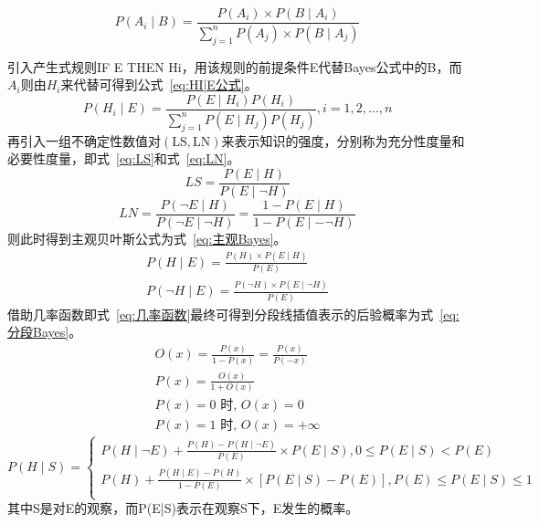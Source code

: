 \documentclass[12pt,a4paper,UTF8]{ctexart}
\begin{document}
\begin{equation}
    \label{eq:全概率Bayes}
    P\left(A_i \mid B\right)=\frac{P\left(A_i\right) \times P\left(B \mid A_i\right)}{\sum_{j=1}^n P\left(A_j\right) \times P\left(B \mid A_j\right)}
    \end{equation}

引入产生式规则IF E THEN Hi，用该规则的前提条件E代替Bayes公式中的B，而$ A_i $则由$ H_i $来代替可得到公式~\ref{eq:HI|E公式}。
\begin{equation}
    \label{eq:HI|E公式}
    P\left(H_i \mid E\right)=\frac{P\left(E \mid H_i\right) P\left(H_i\right)}{\sum_{j=1}^n P\left(E \mid H_j\right) P\left(H_j\right)}, i=1,2, \ldots, n
\end{equation}
再引入一组不确定性数值对$ (\mathrm{LS}, \mathrm{LN}) $来表示知识的强度，分别称为充分性度量和必要性度量，即式~\ref{eq:LS}和式~\ref{eq:LN}。
\begin{equation}
    \label{eq:LS}
    L S=\frac{P(E \mid H)}{P(E \mid \neg H)}
\end{equation}
\begin{equation}
    \label{eq:LN}
    L N=\frac{P(\neg E \mid H)}{P(\neg E \mid \neg H)}=\frac{1-P(E \mid H)}{1-P(E \mid-\neg H)}
\end{equation}
则此时得到主观贝叶斯公式为式~\ref{eq:主观Bayes}。
\begin{equation}
    \label{eq:主观Bayes}
    \begin{gathered}
    P(H \mid E)=\frac{P(H) \times P(E \mid H)}{P(E)} \\
    P(\neg H \mid E)=\frac{P(\neg H) \times P(E \mid \neg H)}{P(E)}
    \end{gathered}
\end{equation}
借助几率函数即式~\ref{eq:几率函数}最终可得到分段线插值表示的后验概率为式~\ref{eq:分段Bayes}。
\begin{equation}
    \label{eq:几率函数}
    \begin{gathered}
    O(x)=\frac{P(x)}{1-P(x)}=\frac{P(x)}{P(-x)} \\
    P(x)=\frac{O(x)}{1+O(x)} \\
    P(x)=0 \text { 时, } O(x)=0 \\
    P(x)=1 \text { 时, } O(x)=+\infty
    \end{gathered}
\end{equation}
\begin{equation}
    \label{eq:分段Bayes}
    P(H \mid S)=\left\{\begin{array}{c}
    P(H \mid \neg E)+\frac{P(H)-P(H \mid \neg E)}{P(E)} \times P(E \mid S), 0 \leq P(E \mid S)<P(E) \\
    P(H)+\frac{P(H \mid E)-P(H)}{1-P(E)} \times[P(E \mid S)-P(E)], P(E) \leq P(E \mid S) \leq 1 \\
    \end{array}\right.
\end{equation}
其中S是对E的观察，而P(E|S)表示在观察S下，E发生的概率。
\end{document}
